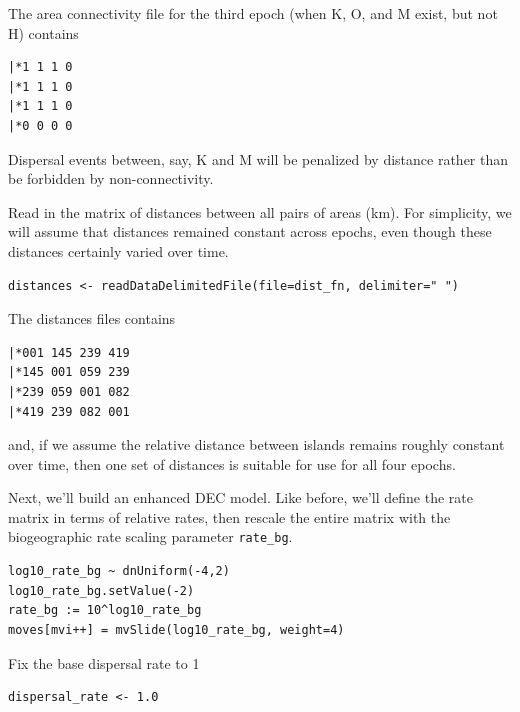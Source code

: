 The area connectivity file for the third epoch (when K, O, and M exist, but not H) contains

\begin{snugshade}
\begin{lstlisting}
|*1 1 1 0
|*1 1 1 0
|*1 1 1 0
|*0 0 0 0
\end{lstlisting}
\end{snugshade}

Dispersal events between, say, K and M will be penalized by distance rather than be forbidden by non-connectivity.


Read in the matrix of distances between all pairs of areas (km).
For simplicity, we will assume that distances remained constant across epochs, even though these distances certainly varied over time.

\begin{snugshade}
\begin{lstlisting}
distances <- readDataDelimitedFile(file=dist_fn, delimiter=" ")
\end{lstlisting}
\end{snugshade}

The distances files contains

\begin{snugshade}
\begin{lstlisting}
|*001 145 239 419
|*145 001 059 239
|*239 059 001 082
|*419 239 082 001
\end{lstlisting}
\end{snugshade}

and, if we assume the relative distance between islands remains roughly constant over time, then one set of distances is suitable for use for all four epochs.


Next, we'll build an enhanced DEC model. Like before, we'll define the rate matrix in terms of relative rates, then rescale the entire matrix with the biogeographic rate scaling parameter {\tt rate\_bg}.

\begin{snugshade}
\begin{lstlisting}
log10_rate_bg ~ dnUniform(-4,2)
log10_rate_bg.setValue(-2)
rate_bg := 10^log10_rate_bg
moves[mvi++] = mvSlide(log10_rate_bg, weight=4)
\end{lstlisting}
\end{snugshade}


Fix the base dispersal rate to 1

\begin{snugshade}
\begin{lstlisting}
dispersal_rate <- 1.0
\end{lstlisting}
\end{snugshade}

